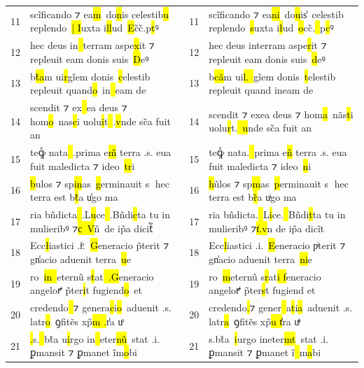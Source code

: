 \documentclass{article}
\begin{document}
\begin{table}[H]
{{\begin{tabular}{rl|rl}
            11 & scĩficando ⁊ ea\hl{m}~do\hl{n}is celestib\hl{u} replendo~\hl{| I}uxta i\hl{ll}ud~\hl{E}c\hl{̃}c̃.p\hl{t}ꝰ & 11 & scĩficando ⁊ ea\hl{ni}~do\hl{u}is\hl{̾}~celestib replendo~\hl{s}uxta i\hl{ł}ud~\hl{o}cc̃.\hl{~}p\hl{c}ꝰ \\
            12 & hec deus in\hl{~}terram aspe\hl{x}it ⁊ repleuit eam donis suis~\hl{D}eꝰ & 12 & hec deus interram aspe\hl{r}it ⁊ repleuit eam donis suis~\hl{d}eꝰ \\
            13 & b\hl{t}̃\hl{a}m ui\hl{r}gĩem donis~\hl{c}elestib repleuit quand\hl{o}~in\hl{~}eam de & 13 & b\hl{ca}̃m ui\hl{l.~}gĩem donis~\hl{t}elestib repleuit quand ineam de \\
            14 & scendit ⁊ ex\hl{~}ea deus ⁊ hom\hl{o}~nas\hl{c}i uolu\hl{i}t\hl{~}.\hl{v}nde sc̃a fuit an & 14 & scendit ⁊ exea deus ⁊ hom\hl{a}~na\hl{̃}s\hl{t}i uolu\hl{r}t.\hl{~u}nde sc̃a fuit an \\
            15 & teꝙͣ nata\hl{~}.prima e\hl{m}̃ terra .s. eua fuit maledicta ⁊ ideo~\hl{tr}i & 15 & teꝙͣ nata.\hl{~}prima e\hl{n}̃ terra .s. eua fuit maledicta ⁊ ideo~\hl{n}i \\
            16 & \hl{b}ulos ⁊ sp\hl{in}as~\hl{g}erminauit s hec terra est b\hl{t}̃a u\hl{̾}go ma & 16 & \hl{h}u\hl{̃}los ⁊ sp\hl{m}as~\hl{p}erminauit s hec terra est b\hl{r}̃a u\hl{ͥ}go ma \\
            17 & ria bñdicta\hl{~}.L\hl{u}ce\hl{~}.Bñdi\hl{c}ta tu in mulieribꝰ ⁊\hl{c}̾\hl{~V}n\hl{̃}~de ip̃a dicit\hl{᷑} & 17 & ria bñdicta.\hl{~}L\hl{i}ce.\hl{~}Bñdi\hl{t}ta tu in mulieribꝰ ⁊\hl{t}̾\hl{.v}n de ip̃a dici\hl{̃}t \\
            18 & Ecc\hl{ł}iastici .i\hl{ͦ}.~\hl{G}eneracio p\hl{̃}terit ⁊ gn̾acio aduenit terra~\hl{u}e & 18 & Ecc\hl{l}iastici .i.~\hl{E}eneracio p\hl{ͥ}terit ⁊ gn̾acio aduenit terra~\hl{ni}e \\
            19 & ro~\hl{in~}eternũ s\hl{t}at\hl{~.G}eneracio angeloꝵ p̃ter\hl{i}t fugiend\hl{o}~et & 19 & ro~\hl{m}eternũ s\hl{r}at\hl{i f}eneracio angeloꝵ p̃ter\hl{s}t fugiend et \\
            20 & credendo\hl{~}⁊ genera\hl{c}i\hl{o}~aduenit .s. latr\hl{o}~ꝯfitẽs xp̃\hl{m .}r\hl{̾}a uͦ & 20 & credendo\hl{.}⁊ gener\hl{~}a\hl{t}i\hl{a}~aduenit .s. latr\hl{a}~ꝯfitẽs xp̃\hl{u t̾}ra uͦ\hl{ͥ} \\
            21 & \hl{.}s.\hl{~}bt̃a u\hl{i}rgo in\hl{~}eter\hl{nũ}~stat .i. ꝑmansit ⁊ ꝑmanet ĩm\hl{o}bi & 21 & s.bt̃a~\hl{i}urgo ineter\hl{mt}~stat .i. ꝑmansit ⁊ ꝑmanet ĩ\hl{~}m\hl{a}bi \\

\end{tabular}}}
\end{table}
\end{document}
